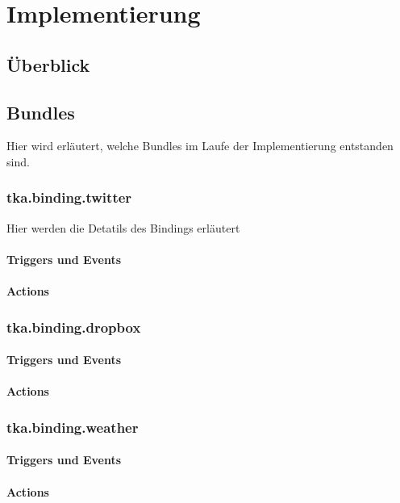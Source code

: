 \chapter{Implementierung}

\section{Überblick}

\section{Bundles}
Hier wird erläutert, welche Bundles im Laufe der Implementierung entstanden sind.

\subsection{tka.binding.twitter}
Hier werden die Detatils des Bindings erläutert
\subsubsection{Triggers und Events}
\subsubsection{Actions}

\subsection{tka.binding.dropbox}
\subsubsection{Triggers und Events}
\subsubsection{Actions}

\subsection{tka.binding.weather}
\subsubsection{Triggers und Events}
\subsubsection{Actions}

